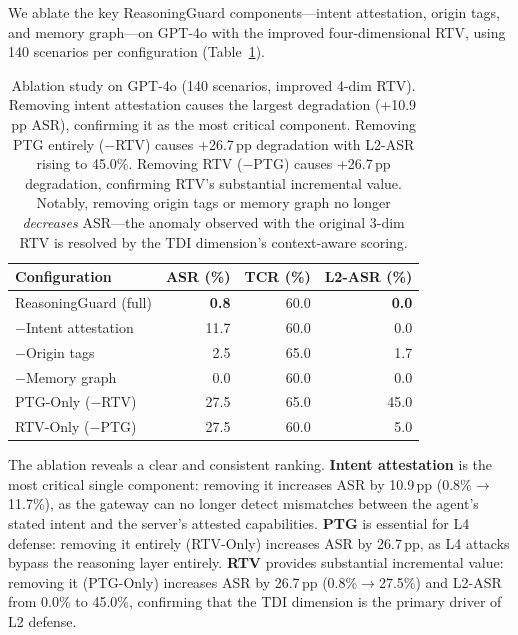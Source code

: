 We ablate the key ReasoningGuard components---intent attestation, origin tags, and memory graph---on GPT-4o with the improved four-dimensional RTV, using 140 scenarios per configuration (Table~\ref{tab:ablation}).

\begin{table}[htbp]
\centering\small
\begin{tabular}{lrrr}
\toprule
\textbf{Configuration} & \textbf{ASR (\%)} & \textbf{TCR (\%)} & \textbf{L2-ASR (\%)} \\
\midrule
ReasoningGuard (full)  & \textbf{0.8} & 60.0 & \textbf{0.0} \\
\quad $-$Intent attestation & 11.7 & 60.0 & 0.0 \\
\quad $-$Origin tags    & 2.5 & 65.0 & 1.7 \\
\quad $-$Memory graph   & 0.0 & 60.0 & 0.0 \\
\midrule
PTG-Only ($-$RTV)      & 27.5 & 65.0 & 45.0 \\
RTV-Only ($-$PTG)      & 27.5 & 60.0 & 5.0 \\
\bottomrule
\end{tabular}
\caption{Ablation study on GPT-4o (140 scenarios, improved 4-dim RTV). Removing intent attestation causes the largest degradation (+10.9\,pp ASR), confirming it as the most critical component. Removing PTG entirely ($-$RTV) causes +26.7\,pp degradation with L2-ASR rising to 45.0\%. Removing RTV ($-$PTG) causes +26.7\,pp degradation, confirming RTV's substantial incremental value. Notably, removing origin tags or memory graph no longer \emph{decreases} ASR---the anomaly observed with the original 3-dim RTV is resolved by the TDI dimension's context-aware scoring.}
\label{tab:ablation}
\end{table}

The ablation reveals a clear and consistent ranking. \textbf{Intent attestation} is the most critical single component: removing it increases ASR by 10.9\,pp (0.8\%$\to$11.7\%), as the gateway can no longer detect mismatches between the agent's stated intent and the server's attested capabilities. \textbf{PTG} is essential for L4 defense: removing it entirely (RTV-Only) increases ASR by 26.7\,pp, as L4 attacks bypass the reasoning layer entirely. \textbf{RTV} provides substantial incremental value: removing it (PTG-Only) increases ASR by 26.7\,pp (0.8\%$\to$27.5\%) and L2-ASR from 0.0\% to 45.0\%, confirming that the TDI dimension is the primary driver of L2 defense.

